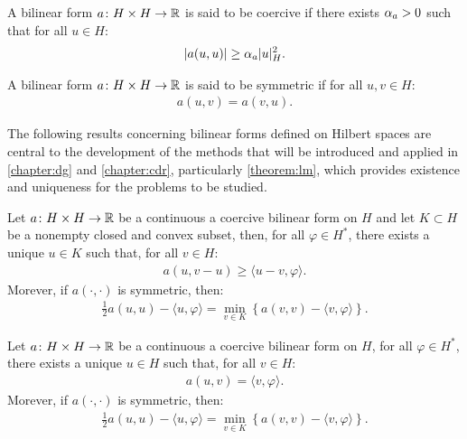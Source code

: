 \begin{definition}
    A bilinear form $a \colon H \times H \rightarrow \mathbb{R}$ is said to be coercive if there exists $\alpha_{a} > 0$ such that for all $u \in H$:
    \begin{align}
        \lvert a(u, u) \rvert \geq \alpha_{a} \lvert u \rvert_H^2.
    \end{align}
\end{definition}

\begin{definition}
    A bilinear form $a \colon H \times H \rightarrow \mathbb{R}$ is said to be symmetric if for all $u, v \in H$:
    \begin{align}
        a(u, v) = a(v, u).
    \end{align}
\end{definition}

The following results concerning bilinear forms defined on Hilbert spaces are central to the development of the methods that will be introduced and applied in \cref{chapter:dg} and \cref{chapter:cdr}, particularly \cref{theorem:lm}, which provides existence and uniqueness for the problems to be studied.

\begin{theorem}[Stampacchia]
    Let $a \colon H \times H \rightarrow \mathbb{R}$ be a continuous a coercive bilinear form on $H$ and let $K \subset H$ be a nonempty closed and convex subset, then, for all $\varphi \in H^*$, there exists a unique $u \in K$ such that, for all $v \in H$:
    \begin{align}
        a(u, v - u) \geq \langle u - v, \varphi \rangle.
    \end{align}
    Morever, if $a(\cdot, \cdot)$ is symmetric, then:
    \begin{align}
        \frac{1}{2} a(u, u) - \langle u, \varphi \rangle = \min_{v \in K} \left\{ a(v, v) - \langle v, \varphi \rangle \right\}.
    \end{align}
\end{theorem}

\begin{corollary} \label{theorem:lm}
    Let $a \colon H \times H \rightarrow \mathbb{R}$ be a continuous a coercive bilinear form on $H$, for all $\varphi \in H^*$, there exists a unique $u \in H$ such that, for all $v \in H$:
    \begin{align}
        a(u, v) = \langle v, \varphi \rangle.
    \end{align}
    Morever, if $a(\cdot, \cdot)$ is symmetric, then:
    \begin{align}
        \frac{1}{2} a(u, u) - \langle u, \varphi \rangle = \min_{v \in K} \left\{ a(v, v) - \langle v, \varphi \rangle \right\}.
    \end{align}
\end{corollary}

